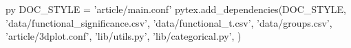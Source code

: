 \makeatletter
	\let\@afterindenttrue\@afterindentfalse
	\@afterindentfalse
\makeatother

\usepackage[explicit]{titlesec}
%
\titlespacing{\section}{0em}{1.5em}{0.4em}
%
\titlespacing{\subsection}{0em}{1em}{0.2em}
%
\titlespacing{\subsubsection}{0em}{0.75em}{0em}

\usepackage[autoprint=false, gobble=auto, pyfuture=all]{pythontex} %
\usepackage{pgf} %


\begin{pythontexcustomcode}[begin]{py}
DOC_STYLE = 'article/main.conf'
pytex.add_dependencies(DOC_STYLE,
	'data/functional_significance.csv',
	'data/functional_t.csv',
	'data/groups.csv',
	'article/3dplot.conf',
	'lib/utils.py',
	'lib/categorical.py',
	)
\end{pythontexcustomcode}


\setlength{\columnsep}{7mm}

\newcommand{\niceus}{\texttt{\_}}

%
